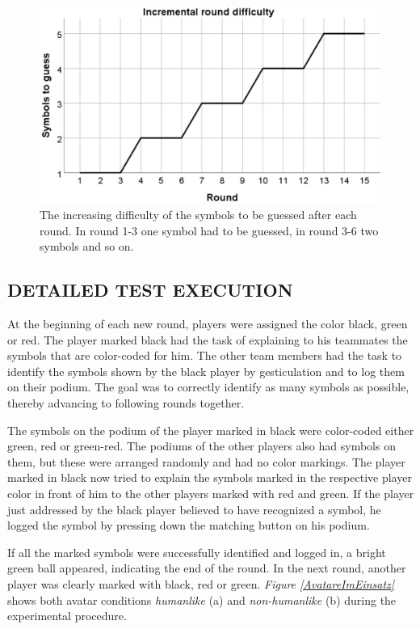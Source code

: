 \documentclass[sigchi]{acmart}
\begin{document}
\begin{figure}[H]
		\begin{footnotesize}
		\centering
			\includegraphics[width=0.9\linewidth]{Abbildungen/RoundDifficulty.JPG}	
			\caption[The difficulty of the rounds]{The increasing difficulty of the symbols to be guessed after each round. In round 1-3 one symbol had to be guessed, in round 3-6 two symbols and so on.}
			\label{RoundDifficulty}
		\end{footnotesize}
	\end{figure}

\subsection{DETAILED TEST EXECUTION}
At the beginning of each new round, players were assigned the color black, green or red.
The player marked black had the task of explaining to his teammates the symbols that are color-coded for him. The other team members had the task to identify the symbols shown by the black player by gesticulation and to log them on their podium. The goal was to correctly identify as many symbols as possible, thereby advancing to following rounds together. %

The symbols on the podium of the player marked in black were color-coded either green, red or green-red. The podiums of the other players also had symbols on them, but these were arranged randomly and had no color markings. The player marked in black now tried to explain the symbols marked in the respective player color in front of him to the other players marked with red and green. If the player just addressed by the black player believed to have recognized a symbol, he logged the symbol by pressing down the matching button on his podium. 

If all the marked symbols were successfully identified and logged in, a bright green ball appeared, indicating the end of the round.
In the next round, another player was clearly marked with black, red or green.
\textit{Figure \ref{AvatareImEinsatz}} shows both avatar conditions \textit{humanlike} (a) and \textit{non-humanlike} (b) during the experimental procedure.
	
\end{document}
